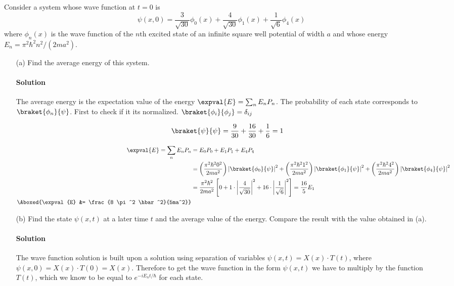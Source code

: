 \documentclass{article}
\begin{document}
	Consider a system whose wave function at $t=0$ is
	\begin{equation}
		\psi(x,0) = \frac{3}{\sqrt{30}} \phi_0 (x) + \frac{4}{\sqrt{30}} \phi_1 (x) + \frac{1}{\sqrt{6}} \phi_4 (x) \label{eq:1}
	\end{equation}
	where $\phi_n(x)$ is the wave function of the $n\text{th}$ excited state of an infinite square well potential of width $a$ and whose energy $E_n = \pi^2 \hbar^2 n^2 / \left( 2ma^2 \right)$.
	\begin{enumerate}
		\item[(a)] Find the average energy of this system.
		\paragraph{Solution} The average energy is the expectation value of the energy $\expval{E} = \sum_{n} E_n P_n$. The probability of each state corresponds to $\braket{\phi_n}{\psi}$. First to check if it its normalized. $\braket{\phi_i}{\phi_j} = \delta_{ij}$
		
		\begin{equation}
			\begin{split}
				\braket{\psi}{\psi} = \frac{9}{30} + \frac{16}{30} + \frac{1}{6} = 1
			\end{split}
		\end{equation}
		
		\begin{equation}
			\begin{split}
				\expval{E} = \sum_{n} E_n P_n &= E_0 P_0 + E_1 P_1 + E_4 P_4 \\
				&= \left( \frac{\pi^2 \hbar^2 0^2}{2ma^2} \right) \left| \braket{\phi_0}{\psi} \right|^2 + \left( \frac{\pi^2 \hbar^2 1^2}{2ma^2} \right) \left| \braket{\phi_1}{\psi} \right|^2 + \left( \frac{\pi^2 \hbar^2 4^2}{2ma^2} \right) \left| \braket{\phi_4}{\psi} \right|^2 \\
				&= \frac{\pi^2 \hbar^2}{2ma^2} \left[ 0 + 1 \cdot \left| \frac{4}{\sqrt{30}} \right|^2 + 16 \cdot \left| \frac{1}{\sqrt{6}} \right|^2 \right] = \frac{16}{5} E_1 \\
				\Aboxed{\expval{E} &= \frac{8 \pi^2 \hbar^2}{5ma^2}}
			\end{split}
		\end{equation}
		
		\item[(b)] Find the state $\psi(x,t)$ at a later time $t$ and the average value of the energy. Compare the result with the value obtained in (a). 
		\paragraph{Solution} The wave function solution is built upon a solution using separation of variables $\psi(x,t) = X(x) \cdot T(t)$, where $\psi(x,0) = X(x) \cdot T(0) = X(x)$. Therefore to get the wave function in the form $\psi(x,t)$ we have to multiply by the function $T(t)$, which we know to be equal to $e^{-i E_n t/\hbar}$ for each state. 
		

\end{enumerate}
\end{document}
